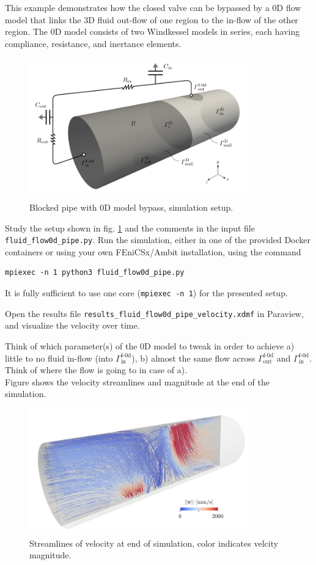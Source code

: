 \documentclass[a4paper,12pt]{report}
\begin{document}
This example demonstrates how the closed valve can be bypassed by a 0D flow model that links the 3D fluid out-flow of one region to the in-flow of the other region. The 0D model consists of two Windkessel models in series, each having compliance, resistance, and inertance elements.

\begin{figure}
\centering
\includegraphics[width=0.85\textwidth]{fig/pipe_0d_setup.png}
\caption{Blocked pipe with 0D model bypass, simulation setup.}
\label{fig:pipe_0d_setup}
\end{figure}

Study the setup shown in fig. \ref{fig:pipe_0d_setup} and the comments in the input file \verb"fluid_flow0d_pipe.py". Run the simulation, either in one of the provided Docker containers or using your own FEniCSx/Ambit installation, using the command
\begin{verbatim}
mpiexec -n 1 python3 fluid_flow0d_pipe.py
\end{verbatim}
It is fully sufficient to use one core (\verb"mpiexec -n 1") for the presented setup.

Open the results file \verb"results_fluid_flow0d_pipe_velocity.xdmf" in Paraview, and visualize the velocity over time.

Think of which parameter(s) of the 0D model to tweak in order to achieve a) little to no fluid in-flow (into $\mathit{\Gamma}_{\mathrm{in}}^{\mathrm{f\text{-}0d}}$), b) almost the same flow across $\mathit{\Gamma}_{\mathrm{out}}^{\mathrm{f\text{-}0d}}$ and $\mathit{\Gamma}_{\mathrm{in}}^{\mathrm{f\text{-}0d}}$. Think of where the flow is going to in case of a).\\

Figure shows the velocity streamlines and magnitude at the end of the simulation.

\begin{figure}
\centering
\includegraphics[width=0.85\textwidth]{fig/pipe_0d_results.png}
\caption{Streamlines of velocity at end of simulation, color indicates velcity magnitude.}
\label{fig:pipe_0d_results}
\end{figure}


\end{document}
